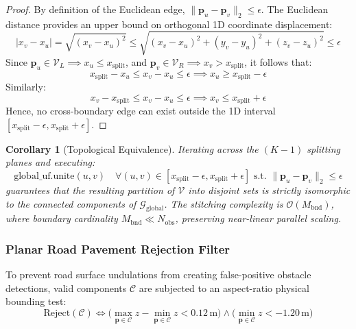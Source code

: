 \documentclass[journal,compsoc]{IEEEtran}
\newtheorem{corollary}[theorem]{Corollary}
\begin{document}
\begin{proof}
By definition of the Euclidean edge, $\|\bm{p}_u - \bm{p}_v\|_2 \le \epsilon$. The Euclidean distance provides an upper bound on orthogonal 1D coordinate displacement:
\begin{equation}
|x_v - x_u| = \sqrt{(x_v - x_u)^2} \le \sqrt{(x_v - x_u)^2 + (y_v - y_u)^2 + (z_v - z_u)^2} \le \epsilon
\end{equation}
Since $\bm{p}_u \in \mathcal{V}_L \implies x_u \le x_{\text{split}}$, and $\bm{p}_v \in \mathcal{V}_R \implies x_v > x_{\text{split}}$, it follows that:
\begin{equation}
x_{\text{split}} - x_u \le x_v - x_u \le \epsilon \implies x_u \ge x_{\text{split}} - \epsilon
\end{equation}
Similarly:
\begin{equation}
x_v - x_{\text{split}} \le x_v - x_u \le \epsilon \implies x_v \le x_{\text{split}} + \epsilon
\end{equation}
Hence, no cross-boundary edge can exist outside the 1D interval $[x_{\text{split}} - \epsilon, x_{\text{split}} + \epsilon]$.
\end{proof}

\begin{corollary}[Topological Equivalence]
Iterating across the $(K-1)$ splitting planes and executing:
\begin{equation}
\text{global\_uf.unite}(u, v) \quad \forall (u, v) \in [x_{\text{split}} - \epsilon, x_{\text{split}} + \epsilon] \text{ s.t. } \|\bm{p}_u - \bm{p}_v\|_2 \le \epsilon
\end{equation}
guarantees that the resulting partition of $\mathcal{V}$ into disjoint sets is strictly isomorphic to the connected components of $\mathcal{G}_{\text{global}}$. The stitching complexity is $\mathcal{O}(M_{\text{bnd}})$, where boundary cardinality $M_{\text{bnd}} \ll N_{\text{obs}}$, preserving near-linear parallel scaling.
\end{corollary}

\subsubsection{Planar Road Pavement Rejection Filter}
To prevent road surface undulations from creating false-positive obstacle detections, valid components $\mathcal{C}$ are subjected to an aspect-ratio physical bounding test:
\begin{equation}
\text{Reject}(\mathcal{C}) \iff \Big( \max_{\bm{p} \in \mathcal{C}} z - \min_{\bm{p} \in \mathcal{C}} z < 0.12\,\text{m} \Big) \land \Big( \min_{\bm{p} \in \mathcal{C}} z < -1.20\,\text{m} \Big)
\label{eq:road_filter}
\end{equation}
\end{document}
